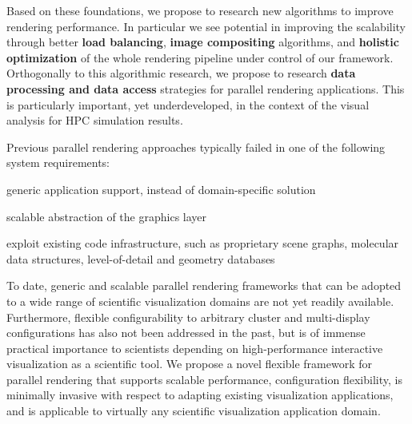 Based on these foundations, we propose to research new algorithms to improve
rendering performance. In particular we see potential in improving the
scalability through better {\bf load balancing}, {\bf image compositing}
algorithms, and {\bf holistic optimization} of the whole rendering pipeline
under control of our framework. Orthogonally to this algorithmic research, we
propose to research {\bf data processing and data access} strategies for
parallel rendering applications. This is particularly important, yet
underdeveloped, in the context of the visual analysis for HPC simulation
results.

Previous parallel rendering approaches typically failed in one of the following
system requirements:
%
\begin{compactenum}
\item generic application support, instead of domain-specific solution
\item scalable abstraction of the graphics layer
\item exploit existing code infrastructure, such as proprietary scene graphs, molecular data structures, level-of-detail and geometry databases
\end{compactenum}

To date, generic and scalable parallel rendering frameworks that can be adopted
to a wide range of scientific visualization domains are not yet readily
available. Furthermore, flexible configurability to arbitrary cluster and
multi-display configurations has also not been addressed in the past, but is of
immense practical importance to scientists depending on high-performance
interactive visualization as a scientific tool. We propose a novel flexible
framework for parallel rendering that supports scalable performance,
configuration flexibility, is minimally invasive with respect to adapting
existing visualization applications, and is applicable to virtually any
scientific visualization application domain.

